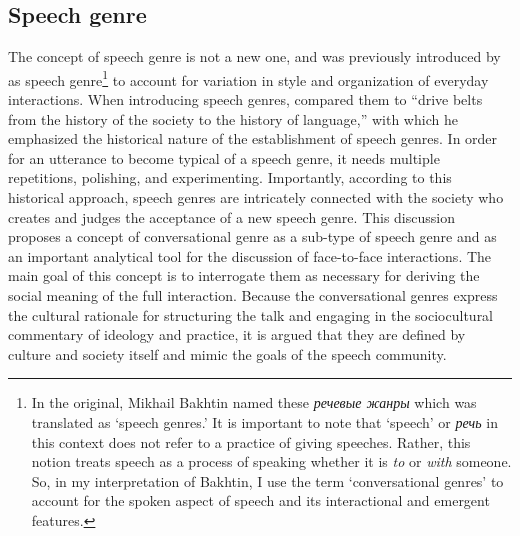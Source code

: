 \documentclass[12pt, draft]{article}
\begin{document}
\subsection{Speech genre}
The concept of speech genre is not a new one, and was previously introduced by \textcite{bakhtin1986} as speech genre\footnote{In the original, Mikhail Bakhtin named these \foreignlanguage{russian}{\textit{речевые жанры}} which was translated as `speech genres.' It is important to note that `speech' or \foreignlanguage{russian}{\textit{речь}} in this context does not refer to a  practice of giving speeches. Rather, this notion treats speech as a process of speaking whether it is \textit{to} or \textit{with} someone. So, in my interpretation of Bakhtin, I use the term `conversational genres' to account for the spoken aspect of speech and its interactional and emergent features.} to account for variation in style and organization of everyday interactions. When introducing speech genres, \textcite[p. 65]{bakhtin1986} compared them to ``drive belts from the history of the society to the history of language,'' with which he emphasized the historical nature of the establishment of speech genres. In order for an utterance to become typical of a speech genre, it needs multiple repetitions, polishing, and experimenting. Importantly, according to this historical approach, speech genres are intricately connected with the society who creates and judges the acceptance of a new speech genre. This discussion proposes a concept of conversational genre as a sub-type of speech genre and as an important analytical tool for the discussion of face-to-face interactions. The main goal of this concept is to interrogate them as necessary for deriving the social meaning of the full interaction. Because the conversational genres express the cultural rationale for structuring the talk and engaging in the sociocultural commentary of ideology and practice, it is argued that they are defined by culture and society itself and mimic the goals of the speech community. 
\end{document}
